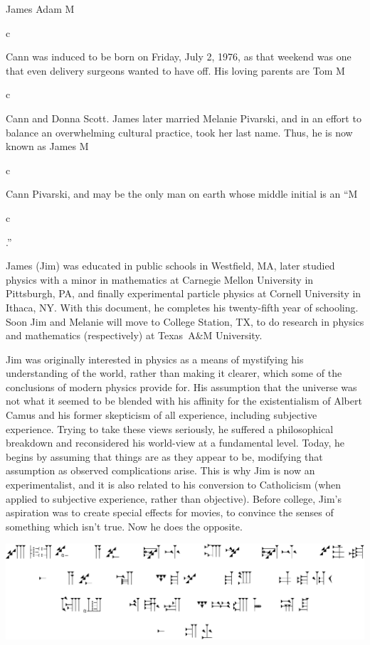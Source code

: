 \documentclass{cornell}
\newlength{\Mheight}
\newlength{\cwidth}
\newcommand{\emc}{\settoheight{\Mheight}{M}\settowidth{\cwidth}{c}M\parbox[b][\Mheight][t]{\cwidth}{c}}
\begin{document}
\begin{biosketch}
  James Adam \emc Cann was induced to be born on Friday, July
  2, 1976, as that weekend was one that even delivery surgeons wanted
  to have off.  His loving parents are Tom \emc Cann and
  Donna Scott.  James later married Melanie Pivarski, and in an effort
  to balance an overwhelming cultural practice, took her last name.
  Thus, he is now known as James \emc Cann Pivarski, and may
  be the only man on earth whose middle initial is an
  ``\emc.''

  James (Jim) was educated in public schools in Westfield, MA, later
  studied physics with a minor in mathematics at Carnegie Mellon
  University in Pittsburgh, PA, and finally experimental particle
  physics at Cornell University in Ithaca, NY.  With this document, he
  completes his twenty-fifth year of schooling.  Soon Jim and Melanie
  will move to College Station, TX, to do research in physics and
  mathematics (respectively) at Texas~A\&M University.
  
  Jim was originally interested in physics as a means of mystifying
  his understanding of the world, rather than making it clearer, which
  some of the conclusions of modern physics provide for.  His
  assumption that the universe was not what it seemed to be blended
  with his affinity for the existentialism of Albert Camus and his
  former skepticism of all experience, including subjective
  experience.  Trying to take these views seriously, he suffered a
  philosophical breakdown and reconsidered his world-view at a
  fundamental level.  Today, he begins by assuming that things are as
  they appear to be, modifying that assumption as observed
  complications arise.  This is why Jim is now an experimentalist, and
  it is also related to his conversion to Catholicism (when applied to
  subjective experience, rather than objective).  Before college,
  Jim's aspiration was to create special effects for movies, to
  convince the senses of something which isn't true.  Now he does the
  opposite.
\end{biosketch}
\begin{dedication}
  \includegraphics[width=\linewidth]{newnewplots/dedication}
\end{dedication}
\end{document}
